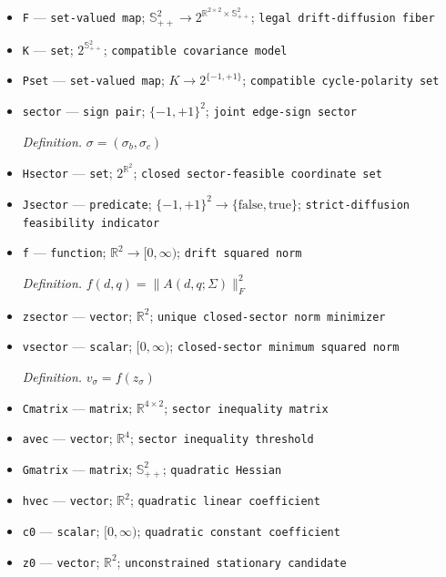 \documentclass{article}
\begin{document}
\begin{itemize}
  \item \texttt{F} --- \texttt{set-\allowbreak{}valued map}; \(\mathbb S_{++}^{2}\to 2^{\mathbb R^{2\times2}\times\mathbb S_{++}^{2}}\); \texttt{legal drift-\allowbreak{}diffusion fiber}
  \item \texttt{K} --- \texttt{set}; \(2^{\mathbb S_{++}^{2}}\); \texttt{compatible covariance model}
  \item \texttt{Pset} --- \texttt{set-\allowbreak{}valued map}; \(K\to 2^{\{-1,+1\}}\); \texttt{compatible cycle-\allowbreak{}polarity set}
  \item \texttt{sector} --- \texttt{sign pair}; \(\{-1,+1\}^{2}\); \texttt{joint edge-\allowbreak{}sign sector}
  \par\smallskip\noindent\emph{Definition.} \(\sigma=(\sigma_b,\sigma_c)\)
  \item \texttt{Hsector} --- \texttt{set}; \(2^{\mathbb R^{2}}\); \texttt{closed sector-\allowbreak{}feasible coordinate set}
  \item \texttt{Jsector} --- \texttt{predicate}; \(\{-1,+1\}^{2}\to\{\mathrm{false},\mathrm{true}\}\); \texttt{strict-\allowbreak{}diffusion feasibility indicator}
  \item \texttt{f} --- \texttt{function}; \(\mathbb R^{2}\to[0,\infty)\); \texttt{drift squared norm}
  \par\smallskip\noindent\emph{Definition.} \(f(d,q)=\lVert A(d,q;\Sigma)\rVert_F^2\)
  \item \texttt{zsector} --- \texttt{vector}; \(\mathbb R^2\); \texttt{unique closed-\allowbreak{}sector norm minimizer}
  \item \texttt{vsector} --- \texttt{scalar}; \([0,\infty)\); \texttt{closed-\allowbreak{}sector minimum squared norm}
  \par\smallskip\noindent\emph{Definition.} \(v_{\sigma}=f(z_{\sigma})\)
  \item \texttt{Cmatrix} --- \texttt{matrix}; \(\mathbb R^{4\times2}\); \texttt{sector inequality matrix}
  \item \texttt{avec} --- \texttt{vector}; \(\mathbb R^4\); \texttt{sector inequality threshold}
  \item \texttt{Gmatrix} --- \texttt{matrix}; \(\mathbb S_{++}^{2}\); \texttt{quadratic Hessian}
  \item \texttt{hvec} --- \texttt{vector}; \(\mathbb R^2\); \texttt{quadratic linear coefficient}
  \item \texttt{c0} --- \texttt{scalar}; \([0,\infty)\); \texttt{quadratic constant coefficient}
  \item \texttt{z0} --- \texttt{vector}; \(\mathbb R^2\); \texttt{unconstrained stationary candidate}

\end{itemize}
\end{document}
